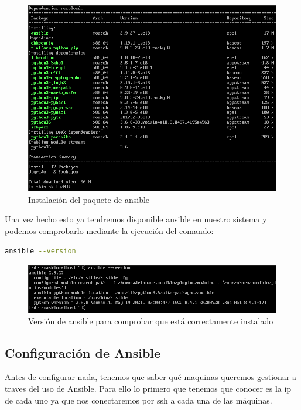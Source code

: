 \begin{figure}[H]
	\centering
	\includegraphics[scale=0.4]{graphics/img14}
	\caption{Instalación del paquete de ansible}
\end{figure}

Una vez hecho esto ya tendremos disponible ansible en nuestro sistema y podemos comprobarlo mediante la ejecución del comando:

\begin{lstlisting}[language=bash]
	ansible --version
\end{lstlisting}

\begin{figure}[H]
	\centering
	\includegraphics[scale=0.4]{graphics/img15}
	\caption{Versión de ansible para comprobar que está correctamente instalado}
\end{figure}

\newpage
\subsection{Configuración de Ansible}

Antes de configurar nada, tenemos que saber qué maquinas queremos gestionar a traves del uso de Ansible. Para ello lo primero que tenemos que conocer es la ip de cada uno ya que nos conectaremos por ssh a cada una de las máquinas.

